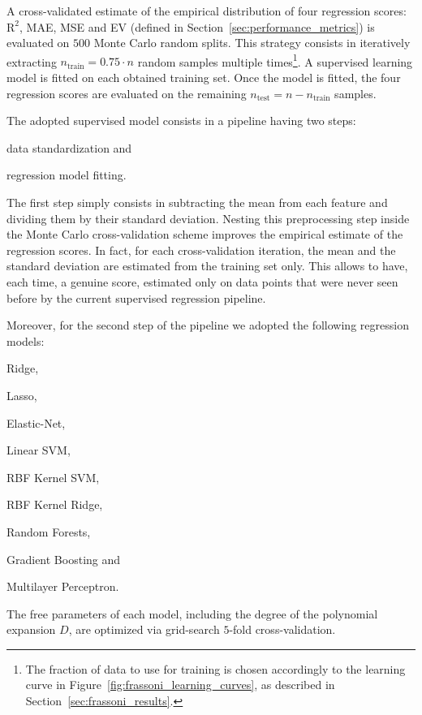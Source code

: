 A cross-validated estimate of the empirical distribution of four regression scores: $\text{R}^2$, MAE, MSE and EV (defined in Section~\ref{sec:performance_metrics}) is evaluated on $500$ Monte Carlo random splits.
This strategy consists in iteratively extracting $n_{\text{train}} = 0.75 \cdot n$ random samples multiple times\footnote{ The fraction of data to use for training is chosen accordingly to the learning curve in Figure~\ref{fig:frassoni_learning_curves}, as described in Section~\ref{sec:frassoni_results}.}. A supervised learning model is fitted on each obtained training set.
Once the model is fitted, the four regression scores are evaluated on the remaining $n_{\text{test}} = n - n_{\text{train}}$ samples.

The adopted supervised model consists in a pipeline having two steps:
\begin{enumerate*}[label=(\roman*)]
	\item data standardization and
	\item regression model fitting.
\end{enumerate*}
The first step simply consists in subtracting the mean from each feature and dividing them by their standard deviation. Nesting this preprocessing step inside the Monte Carlo cross-validation scheme improves the empirical estimate of the regression scores. In fact, for each cross-validation iteration, the mean and the standard deviation are estimated from the training set only. This allows to have, each time, a genuine score, estimated only on data points that were never seen before by the current supervised regression pipeline.

Moreover, for the second step of the pipeline we adopted the following regression models:
\begin{enumerate*}[label=(\alph*)]
	\item Ridge,
	\item Lasso,
	\item Elastic-Net,
	\item Linear SVM,
	\item RBF Kernel SVM,
	\item RBF Kernel Ridge,
	\item Random Forests,
	\item Gradient Boosting and
	\item Multilayer Perceptron.
\end{enumerate*}
The free parameters of each model, including the degree of the polynomial expansion $D$, are optimized via grid-search $5$-fold cross-validation.

